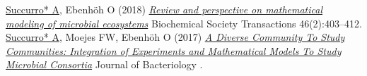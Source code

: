 %
%
%

\renewcommand{\refname}{}

\vspace{-5ex}

\begin{thebibliography}{999}

%
%

 \underline{Succurro* A}, Ebenh{\"{o}}h O (2018) \href{https://doi.org/10.1042/BST20170265}{\textit{Review and perspective on mathematical modeling of microbial ecosystems}} Biochemical Society Transactions 46(2):403--412.
\vspace{-1ex}
 \underline{Succurro* A}, Moejes FW, Ebenh{\"{o}}h O (2017) \href{http://jb.asm.org/content/199/15/e00865-16.abstract}{\textit{A Diverse Community To Study Communities: Integration of Experiments and Mathematical Models To Study Microbial Consortia}}  Journal of Bacteriology .
\end{thebibliography}


